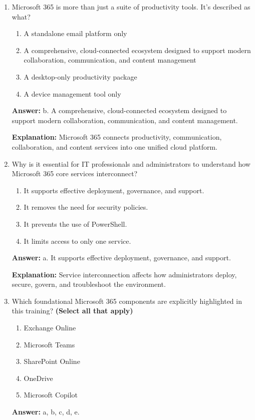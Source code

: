 \documentclass[10pt]{article}
\begin{document}
\begin{enumerate}[leftmargin=*]

\item Microsoft 365 is more than just a suite of productivity tools. It’s described as what?
\begin{enumerate}[label=\alph*., leftmargin=1.5em]
\item A standalone email platform only
\item A comprehensive, cloud-connected ecosystem designed to support modern collaboration, communication, and content management
\item A desktop-only productivity package
\item A device management tool only
\end{enumerate}
\textbf{Answer:} b. A comprehensive, cloud-connected ecosystem designed to support modern collaboration, communication, and content management.

\textbf{Explanation:} Microsoft 365 connects productivity, communication, collaboration, and content services into one unified cloud platform.

\item Why is it essential for IT professionals and administrators to understand how Microsoft 365 core services interconnect?
\begin{enumerate}[label=\alph*., leftmargin=1.5em]
\item It supports effective deployment, governance, and support.
\item It removes the need for security policies.
\item It prevents the use of PowerShell.
\item It limits access to only one service.
\end{enumerate}
\textbf{Answer:} a. It supports effective deployment, governance, and support.

\textbf{Explanation:} Service interconnection affects how administrators deploy, secure, govern, and troubleshoot the environment.

\item Which foundational Microsoft 365 components are explicitly highlighted in this training? \textbf{(Select all that apply)}
\begin{enumerate}[label=\alph*., leftmargin=1.5em]
\item Exchange Online
\item Microsoft Teams
\item SharePoint Online
\item OneDrive
\item Microsoft Copilot
\end{enumerate}
\textbf{Answer:} a, b, c, d, e.


\end{enumerate}
\end{document}
